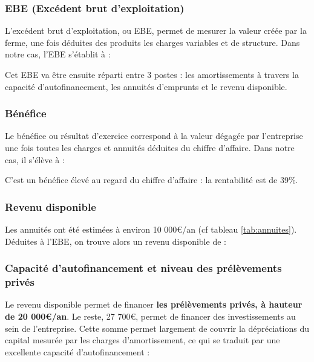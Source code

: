 \documentclass{book}
\begin{document}
\subsubsection{EBE (Excédent brut d'exploitation)}

L'excédent brut d'exploitation, ou EBE, permet de mesurer la valeur créée par la ferme, une fois déduites des produits les charges variables et de structure. Dans notre cas, l'EBE s'établit à :


\noindent{}

Cet EBE va être ensuite réparti entre 3 postes : les amortissements à travers la capacité d'autofinancement, les annuités d'emprunts et le revenu disponible.

\subsubsection{Bénéfice}

Le bénéfice ou résultat d'exercice correspond à la valeur dégagée par l'entreprise une fois toutes les charges et annuités déduites du chiffre d'affaire. Dans notre cas, il s'élève à :

\noindent{}

C'est un bénéfice élevé au regard du chiffre d'affaire : la rentabilité est de 39\%.

\subsubsection{Revenu disponible}

Les annuités ont été estimées à environ 10 000\euro{}/an (cf tableau  \ref{tab:annuites}). Déduites à l'EBE, on trouve alors un revenu disponible de :

\noindent{}

\subsubsection{Capacité d'autofinancement et niveau des prélèvements privés}

Le revenu disponible permet de financer \textbf{les prélèvements privés, à hauteur de 20 000\euro{}/an}. Le reste, 27 700\euro{}, permet de financer des investissements au sein de l'entreprise. Cette somme permet largement de couvrir la dépréciations du capital mesurée par les charges d'amortissement, ce qui se traduit par une excellente capacité d'autofinancement :
\end{document}
